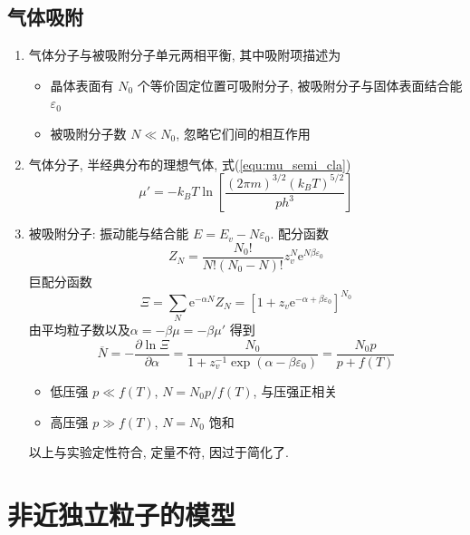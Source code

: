 \documentclass[12pt,a4paper]{article}%
\numberwithin{equation}{section}
\newcommand\e{\mathrm{e}}%
\begin{document}
\subsection{气体吸附} %
\label{sub:gas_adsorption}
\begin{enumerate}
    \item 气体分子与被吸附分子单元两相平衡, 其中吸附项描述为
    \begin{itemize}
        \item 晶体表面有 $N_0$ 个等价固定位置可吸附分子, 被吸附分子与固体表面结合能 $\varepsilon_0$
        \item 被吸附分子数 $N\ll N_0$, 忽略它们间的相互作用
    \end{itemize}
    \item 气体分子, 半经典分布的理想气体, 式(\ref{equ:mu_semi_cla})
    \begin{equation}
        \mu' = -k_BT\ln\left[\frac{(2\pi m)^{3/2}(k_BT)^{5/2}}{ph^3}\right]
    \end{equation}
    \item 被吸附分子: 振动能与结合能 $E = E_v - N\varepsilon_0$. 配分函数
    \begin{equation}
        Z_N = \frac{N_0!}{N!(N_0-N)!}z_v^N\e^{N\beta\varepsilon_0}
    \end{equation}
    巨配分函数
    \begin{equation}
        \Xi = \sum_N \e^{-\alpha N}Z_N 
        = \left[1 + z_v\e^{-\alpha + \beta\varepsilon_0}\right]^{N_0}
    \end{equation}
    由平均粒子数以及$\alpha = -\beta\mu = -\beta\mu'$ 得到
    \begin{equation}
        \overline N = -\frac{\partial \ln\Xi}{\partial\alpha}
        = \frac{N_0}{1+z_v^{-1}\exp(\alpha -\beta\varepsilon_0)}
        = \frac{N_0p}{p+f(T)}
    \end{equation}
    \begin{itemize}
        \item 低压强 $p\ll f(T)$, $N = N_0 p/f(T)$, 与压强正相关
        \item 高压强 $p\gg f(T)$, $N = N_0$ 饱和
    \end{itemize}
    以上与实验定性符合, 定量不符, 因过于简化了.
\end{enumerate}

\section{非近独立粒子的模型} %
\label{sec:model_non-independent}
\end{document}
